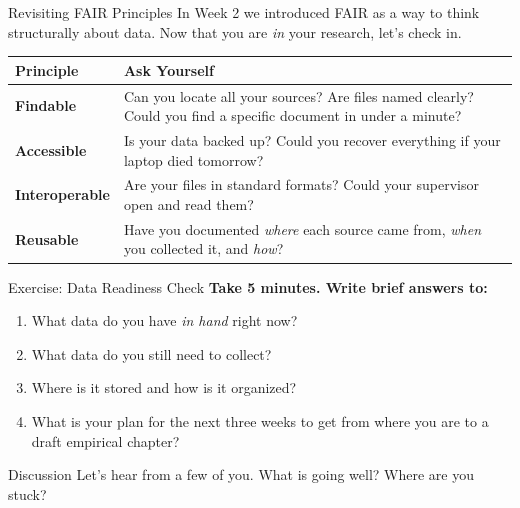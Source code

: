 \documentclass[aspectratio=169,11pt]{beamer}
\begin{document}
\begin{frame}{Revisiting FAIR Principles}
    In Week 2 we introduced FAIR as a way to think structurally about data. Now that you are \textit{in} your research, let's check in.
    \vspace{0.3cm}
    \begin{table}
        \small
        \begin{tabular}{lp{}}
            \toprule
            \textbf{Principle} & \textbf{Ask Yourself} \\
            \midrule
            \textbf{Findable} & Can you locate all your sources? Are files named clearly? Could you find a specific document in under a minute? \\
            \addlinespace
            \textbf{Accessible} & Is your data backed up? Could you recover everything if your laptop died tomorrow? \\
            \addlinespace
            \textbf{Interoperable} & Are your files in standard formats? Could your supervisor open and read them? \\
            \addlinespace
            \textbf{Reusable} & Have you documented \textit{where} each source came from, \textit{when} you collected it, and \textit{how}? \\
            \bottomrule
        \end{tabular}
    \end{table}
\end{frame}

\begin{frame}{Exercise: Data Readiness Check}
    \textbf{Take 5 minutes. Write brief answers to:}
    \vspace{0.3cm}
    \begin{enumerate}
        \item What data do you have \textit{in hand} right now?
        \item What data do you still need to collect?
        \item Where is it stored and how is it organized?
        \item What is your plan for the next three weeks to get from where you are to a draft empirical chapter?
    \end{enumerate}
    \vspace{0.5cm}
    \begin{block}{Discussion}
        Let's hear from a few of you. What is going well? Where are you stuck?
    \end{block}
\end{frame}
\end{document}
